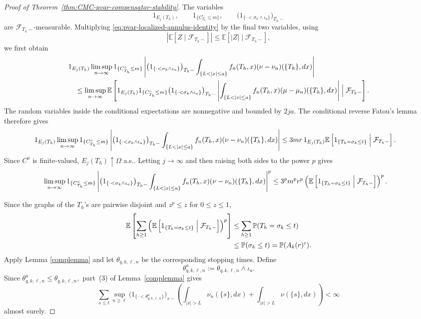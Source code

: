\documentclass[a4paper,10pt]{article}
\newcommand{\E}{\mathbb E}
\renewcommand{\P}{\mathbb P}
\begin{document}
\begin{proof}[Proof of Theorem~\ref{thm:CMC-pvar-compensator-stability}]
The variables
\[
1_{E_j(T_h)},\qquad
1_{\{C^\circ_{T_h}\le m\}},\qquad
\bigl(1_{\{\cdot<\sigma_k\wedge\iota_a\}}\bigr)_{T_h-}
\]
are \(\mathcal F_{T_h-}\)-measurable. Multiplying
\eqref{eq:pvar-localized-annulus-identity} by the final two variables,
using
\[
|\E[Z\mid\mathcal F_{T_h-}]|
\le
\E[|Z|\mid\mathcal F_{T_h-}],
\]
we first obtain
\[
\begin{aligned}
&1_{E_j(T_h)}
\limsup_{n\to\infty}
1_{\{C^\circ_{T_h}\le m\}}
\left|
\bigl(1_{\{\cdot<\sigma_k\wedge\iota_a\}}\bigr)_{T_h-}
\int_{\{L<|x|\le a\}}
f_n(T_h,x)(\nu-\nu_n)(\{T_h\},dx)
\right|
\\
&\quad\le
\limsup_{n\to\infty}
\E\left[
1_{E_j(T_h)}
1_{\{C^\circ_{T_h}\le m\}}
\bigl(1_{\{\cdot<\sigma_k\wedge\iota_a\}}\bigr)_{T_h-}
\left|
\int_{\{L<|x|\le a\}}
f_n(T_h,x)(\mu-\mu_n)(\{T_h\},dx)
\right|
\Bigm|\mathcal F_{T_h-}
\right].
\end{aligned}
\]
The random variables inside the conditional expectations are
nonnegative and bounded by \(2ja\). The conditional reverse Fatou's lemma
therefore gives
\[
\begin{aligned}
&1_{E_j(T_h)}
\limsup_{n\to\infty}
1_{\{C^\circ_{T_h}\le m\}}
\left|
\bigl(1_{\{\cdot<\sigma_k\wedge\iota_a\}}\bigr)_{T_h-}
\int_{\{L<|x|\le a\}}
f_n(T_h,x)(\nu-\nu_n)(\{T_h\},dx)
\right|
\le
3mr\,1_{E_j(T_h)}
\E\left[
1_{\{T_h=\sigma_k\le t\}}
\Bigm|\mathcal F_{T_h-}
\right].
\end{aligned}
\]
Since \(C^a\) is finite-valued,
$
        E_j(T_h)\uparrow\Omega
$ a.s.. Letting \(j\to\infty\) and then raising both sides to the power \(p\)
gives
\begin{align}
&\limsup_{n\to\infty}
1_{\{C^\circ_{T_h}\le m\}}
\left|
\bigl(1_{\{\cdot<\sigma_k\wedge\iota_a\}}\bigr)_{T_h-}
\int_{\{L<|x|\le a\}}
f_n(T_h,x)(\nu-\nu_n)(\{T_h\},dx)
\right|^p
\le
3^pm^pr^p
\left(
\E\left[
1_{\{T_h=\sigma_k\le t\}}
\Bigm|\mathcal F_{T_h-}
\right]
\right)^p.
\label{eq:pvar-conditional-boundary}
\end{align}

Since the graphs of the \(T_h\)'s are pairwise disjoint and
\(z^p\le z\) for \(0\le z\le1\),
\begin{align}
\E\left[
\sum_{h\ge1}
\left(
\E\left[
1_{\{T_h=\sigma_k\le t\}}
\Bigm|\mathcal F_{T_h-}
\right]
\right)^p
\right]
&\le
\sum_{h\ge1}
\P(T_h=\sigma_k\le t)
\nonumber\\
&\le
\P(\sigma_k\le t)
=
\P(A_k(r)^c).
\label{eq:pvar-boundary-probability-sum}
\end{align}
Apply Lemma \ref{complemma} and let
$
        \theta_{q,k,\ell,n}
$
be the corresponding stopping times. Define
\[
        \theta^a_{q,k,\ell,n}
        :=
        \theta_{q,k,\ell,n}\wedge\iota_a.
\]
Since
\(
\theta^a_{q,k,\ell,n}\le\theta_{q,k,\ell,n},
\)
part~(3) of Lemma~\ref{complemma} gives
\[
\sum_{s\le t}
\sup_{n\ge\ell}
\bigl(1_{\{\cdot<\theta^a_{q,k,\ell,n}\}}\bigr)_{s-}
\left(
\int_{|x|>L}\nu_n(\{s\},dx)
+
\int_{|x|>L}\nu(\{s\},dx)
\right)
<\infty
\]
almost surely.


\end{proof}
\end{document}
